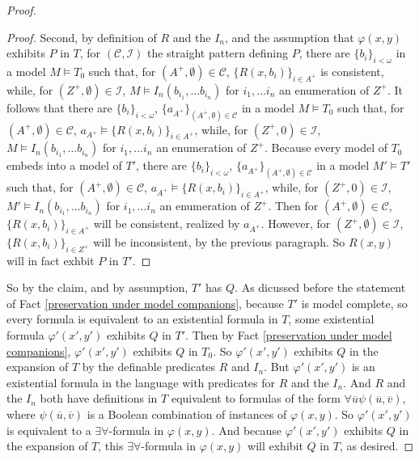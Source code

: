 \documentclass{article}
\theoremstyle{definition}
\theoremstyle{definition}
\theoremstyle{definition}
\begin{document}
\begin{proof}
\begin{proof}
Second, by definition of $R$ and the $I_{n}$, and the assumption that $\varphi(x, y)$ exhibits $P$ in $T$, for $(\mathcal{C}, \mathcal{I})$ the straight pattern defining $P$, there are $\{b_{i}\}_{i < \omega}$ in a model $M \models T_{0}$ such that, for $(A^{+}, \emptyset) \in \mathcal{C}$, $\{R(x, b_{i})\}_{i \in A^{+}}$ is consistent, while, for $(Z^{+}, \emptyset) \in \mathcal{I}$, $M \models I_{n}(b_{i_{1}}, \ldots b_{i_{n}})$ for $i_{1}, \ldots i_{n}$ an enumeration of $Z^{+}$. It follows that there are $\{b_{i}\}_{i < \omega}$, $\{a_{A^{+}}\}_{(A^{+}, \emptyset) \in \mathcal{C}}$ in a model $M \models T_{0}$ such that, for $(A^{+}, \emptyset) \in \mathcal{C}$, $a_{A^{+}} \models \{R(x, b_{i})\}_{i \in A^{+}}$, while, for $(Z^{+}, 0) \in \mathcal{I}$, $M \models I_{n}(b_{i_{1}}, \ldots b_{i_{n}})$ for $i_{1}, \ldots i_{n}$ an enumeration of $Z^{+}$. Because every model of $T_{0}$ embeds into a model of $T'$, there are $\{b_{i}\}_{i < \omega}$, $\{a_{A^{+}}\}_{(A^{+}, \emptyset) \in \mathcal{C}}$ in a model $M' \models T'$ such that, for $(A^{+}, \emptyset) \in \mathcal{C}$, $a_{A^{+}} \models \{R(x, b_{i})\}_{i \in A^{+}}$, while, for $(Z^{+}, 0) \in \mathcal{I}$, $M' \models I_{n}(b_{i_{1}}, \ldots b_{i_{n}})$ for $i_{1}, \ldots i_{n}$ an enumeration of $Z^{+}$. Then for $(A^{+}, \emptyset) \in \mathcal{C}$, $\{R(x, b_{i})\}_{i \in A^{+}}$ will be consistent, realized by $a_{A^{+}}$. However, for $(Z^{+}, \emptyset) \in \mathcal{I}$, $\{R(x, b_{i})\}_{i \in Z^{+}}$ will be inconsistent, by the previous paragraph. So $R(x, y)$ will in fact exhbit $P$ in $T'$.

 
\end{proof}

So by the claim, and by assumption, $T'$ has $Q$. As dicussed before the statement of Fact \ref{preservation under model companions}, because $T'$ is model complete, so every formula is equivalent to an existential formula in $T$, some existential formula $\varphi'(x', y')$ exhibits $Q$ in $T'$. Then by Fact \ref{preservation under model companions}, $\varphi'(x', y')$ exhibits $Q$ in $T_{0}$. So $\varphi'(x', y')$ exhibits $Q$ in the expansion of $T$ by the definable predicates $R$ and $I_{n}$. But $\varphi'(x', y')$ is an existential formula in the language with predicates for $R$ and the $I_{n}$. And $R$ and the $I_{n}$  both have definitions in $T$ equivalent to formulas of the form $\forall \overline{u} \psi(\overline{u}, \overline{v})$, where $\psi(\overline{u}, \overline{v})$ is a Boolean combination of instances of $\varphi(x, y)$. So $\varphi'(x', y')$ is equivalent to a $\exists\forall$-formula in $\varphi(x, y)$. And because $\varphi'(x', y')$  exhibits $Q$ in the expansion of $T$, this $\exists\forall$-formula in $\varphi(x, y)$ will exhibit $Q$ in $T$, as desired.

    
\end{proof}
\end{document}
